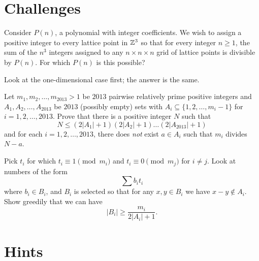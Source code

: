 \documentclass[11pt]{scrartcl}
\begin{document}
\section{Challenges}
\begin{problem}
  Consider $P(n)$, a polynomial with integer coefficients.
  We wish to assign a positive integer to every lattice point in
  $\mathbb Z^3$ so that for every integer $n \ge 1$,
  the sum of the $n^3$ integers assigned to any $n \times n \times n$ grid
  of lattice points is divisible by $P(n)$.
  For which $P(n)$ is this possible?
  \begin{hint}
    Look at the one-dimensional case first;
    the answer is the same.
  \end{hint}
\end{problem}

\begin{problem}
  Let $m_1,m_2,\ldots,m_{2013} > 1$ be $2013$
  pairwise relatively prime positive integers
  and $A_1,A_2,\ldots,A_{2013}$ be $2013$ (possibly empty) sets
  with $A_i\subseteq \{1,2,\ldots,m_i-1\}$ for $i=1,2,\ldots,2013$.
  Prove that there is a positive integer $N$ such that
   \[ N \le \left( 2\left\lvert A_1 \right\rvert + 1 \right)
     \left( 2\left\lvert A_2 \right\rvert + 1 \right)
     \dots\left( 2\left\lvert A_{2013} \right\rvert + 1 \right) \]
  and for each $i = 1, 2, \ldots, 2013$,
  there does \emph{not} exist $a \in A_i$ such that $m_i$ divides $N-a$.
  \begin{hint}
    Pick $t_i$ for which $t_i \equiv 1 \pmod{m_i}$ and $t_i \equiv 0 \pmod{m_j}$ for $i \neq j$.
    Look at numbers of the form \[ \sum b_i t_i \] where $b_i \in B_i$,
    and $B_i$ is selected so that for any $x,y \in B_i$
    we have $x-y \notin A_i$.
    Show greedily that we can have \[ \left\lvert B_i \right\rvert \ge
    \frac{m_i}{2\left\lvert A_i \right\rvert+1}. \]
  \end{hint}
\end{problem}


\eject
\section{Hints}
\begin{enumerate}

\end{enumerate}
\end{document}
